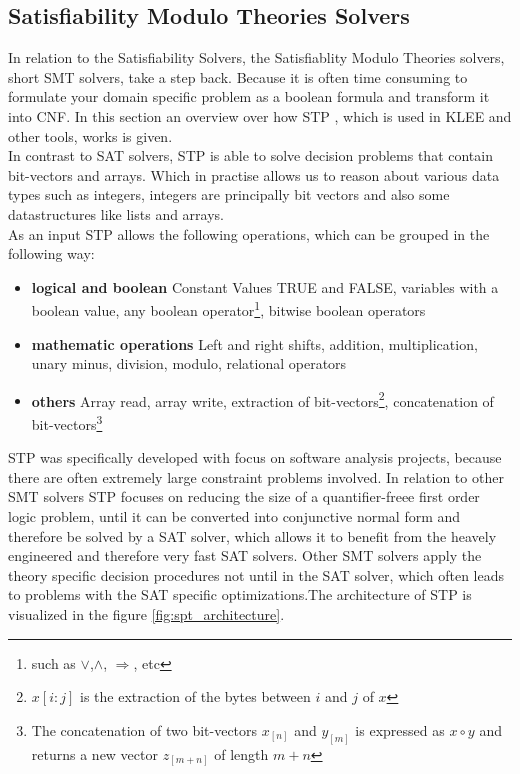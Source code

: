 \subsection{Satisfiability Modulo Theories Solvers}
In relation to the Satisfiability Solvers, the Satisfiablity Modulo Theories solvers, short SMT solvers, take a step back. Because it is often time consuming to formulate your domain specific problem as a boolean formula and transform it into CNF. In this section an overview over how STP \cite{Ganesh:2007:DPB:1770351.1770421}, which is used in KLEE and other tools, works is given.\\
In contrast to SAT solvers, STP is able to solve decision problems that contain bit-vectors and arrays. Which in practise allows us to reason about various data types such as integers, integers are principally bit vectors and also some datastructures like lists and arrays.\\
As an input STP allows the following operations, which can be grouped in the following way:\\
\begin{itemize}
\item \textbf{logical and boolean} Constant Values TRUE and FALSE, variables with a boolean value, any boolean operator\footnote{such as $\lor$,$\land$, $\Rightarrow$, etc}, bitwise boolean operators \\
\item \textbf{mathematic operations} Left and right shifts, addition, multiplication, unary minus, division, modulo, relational operators\\
\item \textbf{others} Array read, array write,  extraction of bit-vectors\footnote{$x[i:j]$ is the extraction of the bytes between $i$ and $j$ of $x$}, concatenation of bit-vectors\footnote{The concatenation of two bit-vectors $x_{[n]}$ and $y_{[m]}$ is expressed as $x \circ y$ and returns a new vector $z_{[m+n]}$ of length $m+n$}\\
\end{itemize}
STP was specifically developed with focus on software analysis projects, because there are often extremely large constraint problems involved. In relation to other SMT solvers STP focuses on reducing the size of a quantifier-freee first order logic problem, until it can be converted into conjunctive normal form and therefore be solved by a SAT solver, which allows it to benefit from the heavely engineered and therefore very fast SAT solvers. Other SMT solvers apply the theory specific decision procedures not until in the SAT solver, which often leads to problems with the SAT specific optimizations.The architecture of STP is visualized in the figure \ref{fig:spt_architecture}.

